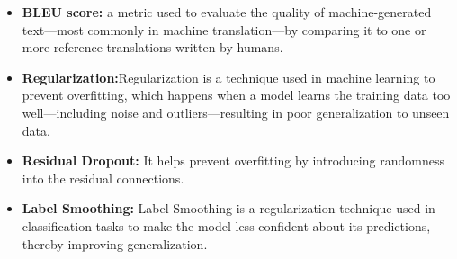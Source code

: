 \documentclass{article}
\begin{document}
\begin{itemize}
    \item \textbf{BLEU score:} a metric used to evaluate the quality of machine-generated text—most commonly in machine translation—by comparing it to one or more reference translations written by humans.
    \item\textbf{Regularization:}Regularization is a technique used in machine learning to prevent overfitting, which happens when a model learns the training data too well—including noise and outliers—resulting in poor generalization to unseen data.
    \item \textbf{Residual Dropout: }It helps prevent overfitting by introducing randomness into the residual connections.
    \item \textbf{Label Smoothing: }Label Smoothing is a regularization technique used in classification tasks to make the model less confident about its predictions, thereby improving generalization.
    
\subsection{}
\end{itemize}
\end{document}
